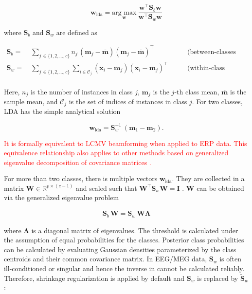 \documentclass[utf8]{frontiersSCNS} %
\newcommand{\m}{\mathbf{m}}
\newcommand{\mbar}{\overline{\m}}
\newcommand{\mm}[1]{\m_{#1}}
\newcommand{\w}{\mathbf{w}}
\newcommand{\x}{\mathbf{x}}
\newcommand{\I}{\mathbf{I}}
\newcommand{\R}{\mathbb{R}}
\renewcommand{\S}{\mathbf{S}}
\newcommand{\W}{\mathbf{W}}
\newcommand{\red}[1]{\textcolor{red}{#1}}
\begin{document}
\begin{equation}
\label{eq:fda}
\w_{\text{lda}} = \underset{\w}{\text{arg max}}\ \frac{\w^\top \S_b\w}{\w^\top \S_w\w}
\end{equation}

where $\S_b$ and $\S_w$ are defined as

\begin{equation*}
\begin{alignedat}{2}
\S_b =\ & \sum_{j\,\in\{1,2,...,c\}}n_j\,(\mm{j} -\mbar) (\mm{j} - \mbar)^\top\ \quad &&\text{(between-classes scatter)}\\
\S_w =\ & \sum_{j\,\in\{1,2,...,c\}}\sum_{i\in\mathcal{C}_j} (\x_i - \mm{j})(\x_i - \mm{j})^\top\  \quad &&\text{(within-class scatter)}\\
\end{alignedat}
\end{equation*}

Here, $n_j$ is the number of instances in class $j$, $\m_j$ is the $j$-th class mean, $\mbar$ is the sample mean, and $\mathcal{C}_j$ is the set of indices of instances in class $j$. For two classes, LDA has the simple analytical solution 

\begin{equation}
\label{eq:lda_solution}
\w_{\text{lda}} = \S_w^{-1}\ (\m_1 - \m_2).
\end{equation}

\red{It is formally equivalent to LCMV beamforming \citep{Treder2016} when applied to ERP data. This equivalence relationship also applies to other methods based on generalized eigenvalue decomposition of covariance matrices \citep{DeCheveigne2014JointAnalysis}.}
 
For more than two classes, there is multiple vectors $\w_{\text{lda}}$. They are collected in a matrix $\W\in\R^{p\times(c-1)}$ and scaled such that $\W^\top\S_w\W = \I$ \citep{Bishop2007}. $\W$ can be obtained via the generalized eigenvalue problem

\begin{align}
\label{eq:LDA-eigenvalue-multiclass}
\S_b\,\W = \S_w\,\W\mathbf{\Lambda}
\end{align}

where $\mathbf{\Lambda}$ is a diagonal matrix of eigenvalues. 
The threshold is calculated under the assumption of equal probabilities for the classes. Posterior class probabilities can be calculated by evaluating Gaussian densities parameterized by the class centroids and their common covariance matrix. In EEG/MEG data, $\S_w$ is often ill-conditioned or singular and hence the inverse in  cannot be calculated reliably. Therefore, shrinkage regularization is applied by default and $\S_w$ is replaced by $\widetilde{\S}_w$:
\end{document}
